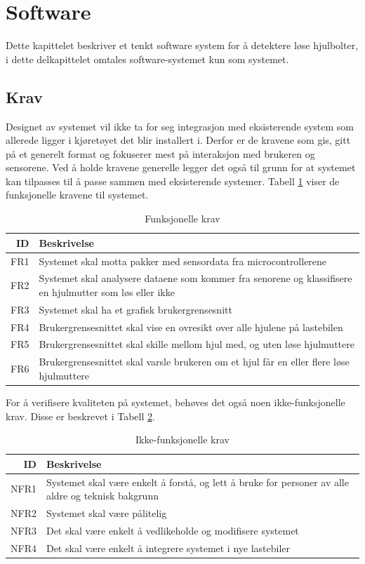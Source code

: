 \section{Software}
Dette kapittelet beskriver et tenkt software system for å detektere løse hjulbolter, i dette delkapittelet omtales software-systemet kun som systemet.

\subsection{Krav}
Designet av systemet vil ikke ta for seg integrasjon med eksisterende system som allerede ligger i kjøretøyet det blir installert i. Derfor er de kravene som gis, gitt på et generelt format og fokuserer mest på interaksjon med brukeren og sensorene. Ved å holde kravene generelle legger det også til grunn for at systemet kan tilpasses til å passe sammen med eksisterende systemer. Tabell \ref{tab:frequirements} viser de funksjonelle kravene til systemet.
\begin{table}[H]
\caption{Funksjonelle krav}
\label{tab:frequirements}
\begin{tabularx}{\textwidth}{r|X}
ID & Beskrivelse \\ 
\hline
FR1 & Systemet skal motta pakker med sensordata fra microcontrollerene \\
FR2 & Systemet skal analysere dataene som kommer fra senorene og klassifisere en hjulmutter som løs eller ikke \\
FR3 & Systemet skal ha et grafisk brukergrensesnitt \\
FR4 & Brukergrensesnittet skal vise en ovresikt over alle hjulene på lastebilen \\
FR5 & Brukergrensesnittet skal skille mellom hjul med, og uten løse hjulmuttere \\
FR6 & Brukergrensesnittet skal varsle brukeren om et hjul får en eller flere løse hjulmuttere \\
\hline
\end{tabularx}
\end{table}

For å verifisere kvaliteten på systemet, behøves det også noen ikke-funksjonelle krav. Disse er beskrevet i Tabell \ref{tab:nfrequirements}.
\begin{table}[H]
\caption{Ikke-funksjonelle krav}
\label{tab:nfrequirements}
\begin{tabularx}{\textwidth}{r|X}
ID & Beskrivelse \\ 
\hline
NFR1 & Systemet skal være enkelt å forstå, og lett å bruke for personer av alle aldre og teknisk bakgrunn \\
NFR2 & Systemet skal være pålitelig \\
NFR3 & Det skal være enkelt å vedlikeholde og modifisere systemet \\
NFR4 & Det skal være enkelt å integrere systemet i nye lastebiler\\
\hline
\end{tabularx}
\end{table}

